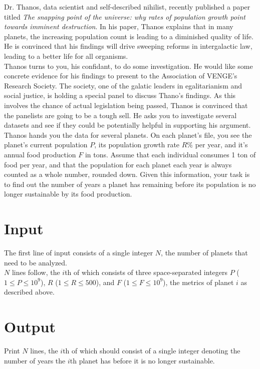 
\noindent Dr. Thanos, data scientist and self-described nihilist, recently published a paper titled \textit{The snapping point of the universe: why rates of population growth point towards imminent destruction}. In his paper, Thanos explains that in many planets, the increasing population count is leading to a diminished quality of life. He is convinced that his findings will drive sweeping reforms in intergalactic law, leading to a better life for all organisms.\\

Thanos turns to you, his confidant, to do some investigation. He would like some concrete evidence for his findings to present to the Association of VENGE's Research Society. The society, one of the galatic leaders in egalitarianism and social justice, is holding a special panel to discuss Thano's findings. As this involves the chance of actual legislation being passed, Thanos is convinced that the panelists are going to be a tough sell. He asks you to investigate several datasets and see if they could be potentially helpful in supporting his argument.\\

Thanos hands you the data for several planets. On each planet's file, you see the planet's current population $P$, its population growth rate $R\%$ per year, and it's annual food production $F$ in tons. Assume that each individual consumes 1 ton of food per year, and that the population for each planet each year is always counted as a whole number, rounded down. Given this information, your task is to find out the number of years a planet has remaining before its population is no longer sustainable by its food production.

\section*{Input}
The first line of input consists of a single integer $N$, the number of planets that need to be analyzed.\\

\noindent $N$ lines follow, the $i$th of which consists of three space-separated integers $P$ ($1 \leq P \leq 10^9$), $R$ ($1 \le R \le 500$), and $F$ ($1 \leq F \leq 10^9$), the metrics of planet $i$ as described above.

\section*{Output}
Print $N$ lines, the $i$th of which should consist of a single integer denoting the number of years the $i$th planet has before it is no longer sustainable.\\
